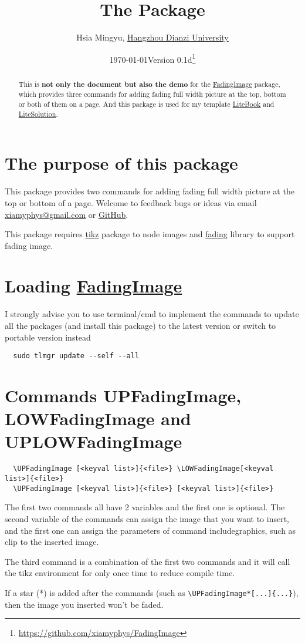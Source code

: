 \documentclass[11pt]{article}
\title{\bfseries The \pkg{FadingImage} Package}
\author{Hsia Mingyu, \href{https://www.hdu.edu.cn}{Hangzhou Dianzi University}}
\affil{\href{mailto:xiamyphys@gmail.com}{\ttfamily xiamyphys@gmail.com}}
\date{\today\quad Version 0.1d\thanks{\url{https://github.com/xiamyphys/FadingImage}}}
\def\pkg#1{\texorpdfstring{\textcolor{pkgcolor}{
    \href{https://ctan.org/pkg/#1}{\textsf{#1}}}}{“#1”}}
\def\cmd#1{\texorpdfstring{\textcolor{cmdcolor}{\textsf{#1}}}{“#1”}}
\begin{document}
\maketitle
{}

\vspace{-6ex}
\begin{abstract}
This is \textsf{\textbf{not only the document but also the demo}} for the \pkg{FadingImage} package, which provides three commands for adding fading full width picture at the top, bottom or both of them on a page. And this package is used for my template \pkg{LiteBook} and \pkg{LiteSolution}.
\end{abstract}

\section{The purpose of this package}
This package provides two commands for adding fading full width picture at the top or bottom of a page. Welcome to feedback bugs or ideas via email \href{mailto:xiamyphys@gmail.com}{\ttfamily xiamyphys@gmail.com} or \href{https://github.com/xiamyphys/fadingimage}{GitHub}.

This package requires \pkg{tikz} package to node images and \pkg{fading} library to support fading image.

\section{Loading \pkg{FadingImage}}
I strongly advise you to use terminal/cmd to implement the commands to update all the packages (and install this package) to the latest version or switch to portable version instead
\begin{verbatim}
  sudo tlmgr update --self --all
\end{verbatim}

\section{Commands \cmd{UPFadingImage}, \cmd{LOWFadingImage} and \cmd{UPLOWFadingImage}}
\begin{small}
\begin{verbatim}
  \UPFadingImage [<keyval list>]{<file>} \LOWFadingImage[<keyval list>]{<file>}
  \UPFadingImage [<keyval list>]{<file>} [<keyval list>]{<file>}
\end{verbatim}
\end{small}

The first two commands all have 2 variables and the first one is optional. The second variable of the commands can assign the image that you want to insert, and the first one can assign the parameters of command \cmd{includegraphics}, such as clip to the inserted image.

The third command is a combination of the first two commands and it will call the \cmd{tikz} environment for only once time to reduce compile time.

If a star (*) is added after the commands (such as \verb|\UPFadingImage*[...]{...}|), then the image you inserted won't be faded.
\end{document}
